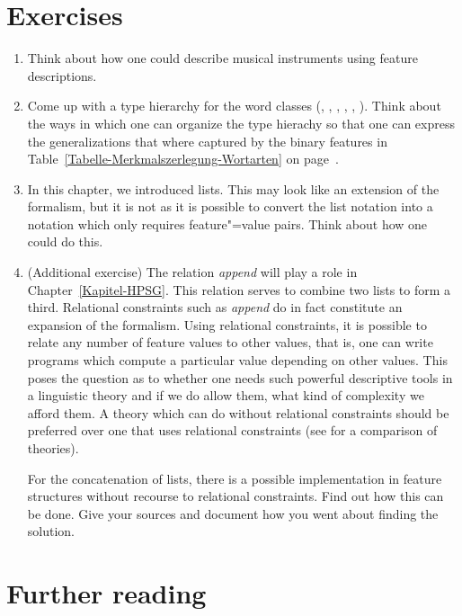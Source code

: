 \section*{Exercises}

\begin{enumerate}
\item Think about how one could describe musical instruments using feature descriptions.
\item Come up with a type hierarchy for the word classes (, , , ,
      , ). Think about the ways in which one can organize the type hierachy so that one
	  can express the generalizations that where captured by the binary features in Table~\ref{Tabelle-Merkmalszerlegung-Wortarten} on page~\pageref{Tabelle-Merkmalszerlegung-Wortarten}.
\item\label{ua-liste} In this chapter, we introduced lists. This may look like an extension of the formalism, but it is not as it is possible to
convert the list notation into a notation which only requires feature"=value pairs. Think about how one could do this.
\item (Additional exercise) The relation \emph{append} will play a role in Chapter~\ref{Kapitel-HPSG}. This relation serves to
combine two lists to form a third.
Relational constraints such as \emph{append} do in fact constitute an expansion of the formalism. Using relational constraints, it is possible to relate any number
of feature values to other values, that is, one can write programs which compute a particular value depending on other values. 
This poses the question as to whether one needs such powerful descriptive tools in a linguistic theory and if we do allow them, what kind of complexity we afford them.
A theory which can do without relational constraints should be preferred over one that uses
relational constraints (see \citealp[Chapter~20]{MuellerLehrbuch1} for a comparison of theories).

For the concatenation of lists, there is a possible implementation in feature structures without
recourse to relational constraints. Find out how this can be done. Give your sources and document
how you went about finding the solution.

\end{enumerate}


\section*{Further reading}

